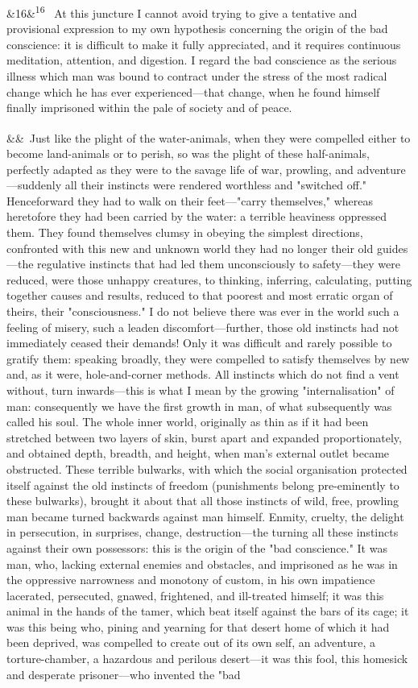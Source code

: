 \documentclass[12pt]{article}
\newcommand{\para}[1][]{\par\noindent\ifx&#1&\else\textsuperscript{\footnotesize #1}~\fi}
\begin{document}
\para[16] At this juncture I cannot avoid trying to give a tentative and provisional expression to my own hypothesis concerning the origin of the bad conscience: it is difficult to make it fully appreciated, and it requires continuous meditation, attention, and digestion. I regard the bad conscience as the serious illness which man was bound to contract under the stress of the most radical change which he has ever experienced---that change, when he found himself finally imprisoned within the pale of society and of peace.

\para Just like the plight of the water-animals, when they were compelled either to become land-animals or to perish, so was the plight of these half-animals, perfectly adapted as they were to the savage life of war, prowling, and adventure---suddenly all their instincts were rendered worthless and "switched off." Henceforward they had to walk on their feet---"carry themselves," whereas heretofore they had been carried by the water: a terrible heaviness oppressed them. They found themselves clumsy in obeying the simplest directions, confronted with this new and unknown world they had no longer their old guides---the regulative instincts that had led them unconsciously to safety---they were reduced, were those unhappy creatures, to thinking, inferring, calculating, putting together causes and results, reduced to that poorest and most erratic organ of theirs, their "consciousness." I do not believe there was ever in the world such a feeling of misery, such a leaden discomfort---further, those old instincts had not immediately ceased their demands! Only it was difficult and rarely possible to gratify them: speaking broadly, they were compelled to satisfy themselves by new and, as it were, hole-and-corner methods. All instincts which do not find a vent without, turn inwards---this is what I mean by the growing "internalisation" of man: consequently we have the first growth in man, of what subsequently was called his soul. The whole inner world, originally as thin as if it had been stretched between two layers of skin, burst apart and expanded proportionately, and obtained depth, breadth, and height, when man's external outlet became obstructed. These terrible bulwarks, with which the social organisation protected itself against the old instincts of freedom (punishments belong pre-eminently to these bulwarks), brought it about that all those instincts of wild, free, prowling man became turned backwards against man himself. Enmity, cruelty, the delight in persecution, in surprises, change, destruction---the turning all these instincts against their own possessors: this is the origin of the "bad conscience." It was man, who, lacking external enemies and obstacles, and imprisoned as he was in the oppressive narrowness and monotony of custom, in his own impatience lacerated, persecuted, gnawed, frightened, and ill-treated himself; it was this animal in the hands of the tamer, which beat itself against the bars of its cage; it was this being who, pining and yearning for that desert home of which it had been deprived, was compelled to create out of its own self, an adventure, a torture-chamber, a hazardous and perilous desert---it was this fool, this homesick and desperate prisoner---who invented the "bad 
\end{document}
